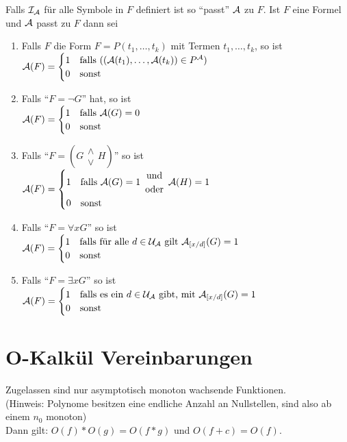 \documentclass{article}
\begin{document}
			Falls $\mathcal{I}_{\mathcal{A}}$ für alle Symbole in $F$ definiert ist so "`passt"' $\mathcal{A}$ zu $F$.
			Ist $F$ eine Formel und $\mathcal{A}$ passt zu $F$ dann sei
			
			\begin{enumerate}
				\item Falls $F$ die Form $F=P(t_1, \ldots, t_k)$ mit Termen $t_1, \ldots, t_k$, so ist\\ $\mathcal{A}(F)=
					\begin{cases}
					1 & \text{falls } ((\mathcal{A}(t_1), \ldots, \mathcal{A}(t_k)) \in P^{\mathcal{A}}) \\
					0 & \text{sonst }
					\end{cases}$
				\item Falls "`$F = \neg G$"' hat, so ist\\ $\mathcal{A}(F)=
					\begin{cases}
					1 & \text{falls $\mathcal{A}(G)=0$} \\
					0 & \text{sonst}
					\end{cases}$
				\item Falls "`$F=(G \begin{array}{c}\wedge\\\vee\end{array} H)$"' so ist\\ $\mathcal{A}(F)=
					\begin{cases}
					1 & \text{falls }\mathcal{A}(G)=1 \begin{array}{c}\text{und}\\\text{oder}\end{array} \mathcal{A}(H)=1 \\
					0 & \text{sonst}
					\end{cases}$
				\item Falls "`$F=\forall xG$"' so ist\\ $\mathcal{A}(F)=
					\begin{cases}
					1 & \text{falls für alle $d \in \mathcal{U}_{\mathcal{A}}$ gilt $\mathcal{A}_{[x/d]}(G)=1$} \\
					0 & \text{sonst}
					\end{cases}$
				\item Falls "`$F=\exists xG$"' so ist\\ $\mathcal{A}(F)=
					\begin{cases}
					1 & \text{falls es ein $d \in \mathcal{U}_{\mathcal{A}}$ gibt, mit $\mathcal{A}_{[x/d]}(G)=1$}\\
					0 & \text{sonst}
					\end{cases}$
				\end{enumerate}


\section{O-Kalkül Vereinbarungen}

Zugelassen sind nur asymptotisch monoton wachsende Funktionen. \\
(Hinweis: Polynome besitzen eine endliche Anzahl an Nullstellen, sind also ab einem $n_0$ monoton) \\
Dann gilt: $O(f)*O(g)=O(f*g)$ und $O(f+c)=O(f)$.
\end{document}
